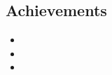 \documentclass[11pt,a4paper]{article}
\begin{document}
\begin{multicols}{2}
\section{Achievements}
\begin{itemize}[leftmargin=*,noitemsep,topsep=2pt]
    \item [ACHIEVEMENT_1]
    \item [ACHIEVEMENT_2]
    \item [ACHIEVEMENT_3]
\end{itemize}

\end{multicols}
\end{document}
